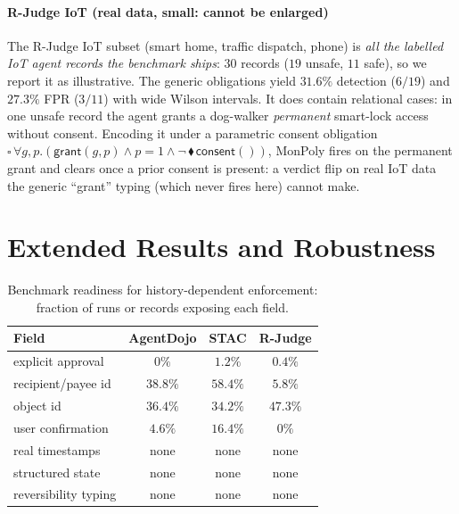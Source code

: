 \documentclass[sigconf]{acmart}
\begin{document}
\paragraph{R-Judge IoT (real data, small: cannot be enlarged)} The R-Judge IoT
subset (smart home, traffic dispatch, phone) is \emph{all the labelled IoT agent
records the benchmark ships}: $30$ records ($19$ unsafe, $11$ safe), so we report it as
illustrative. The generic obligations yield $31.6\%$ detection ($6/19$) and $27.3\%$
FPR ($3/11$) with wide Wilson intervals. It does contain relational cases: in one
unsafe record the agent grants a dog-walker \emph{permanent} smart-lock access without
consent. Encoding it under a parametric consent obligation
$\square\,\forall g,p.(\mathsf{grant}(g,p)\wedge p{=}1\wedge
\neg\,\blacklozenge\,\mathsf{consent}())$, MonPoly fires on the permanent grant and
clears once a prior consent is present: a verdict flip on real IoT data the generic
``grant'' typing (which never fires here) cannot make.

\label{app:timed}

\section{Extended Results and Robustness}
\label{app:extended}
\begin{table}[t]
\centering
\caption{Benchmark readiness for history-dependent enforcement: fraction of
runs or records exposing each field.}
\label{tab:score}
\renewcommand{\arraystretch}{1.1}
\setlength{\tabcolsep}{5pt}
\small
\begin{tabular}{lccc}
\toprule
Field & AgentDojo & STAC & R-Judge \\
\midrule
explicit approval      & $0\%$    & $1.2\%$  & $0.4\%$  \\
recipient/payee id     & $38.8\%$ & $58.4\%$ & $5.8\%$  \\
object id              & $36.4\%$ & $34.2\%$ & $47.3\%$ \\
user confirmation      & $4.6\%$  & $16.4\%$ & $0\%$    \\
real timestamps        & none     & none     & none     \\
structured state       & none     & none     & none     \\
reversibility typing   & none     & none     & none     \\
\bottomrule
\end{tabular}
\end{table}
\end{document}
